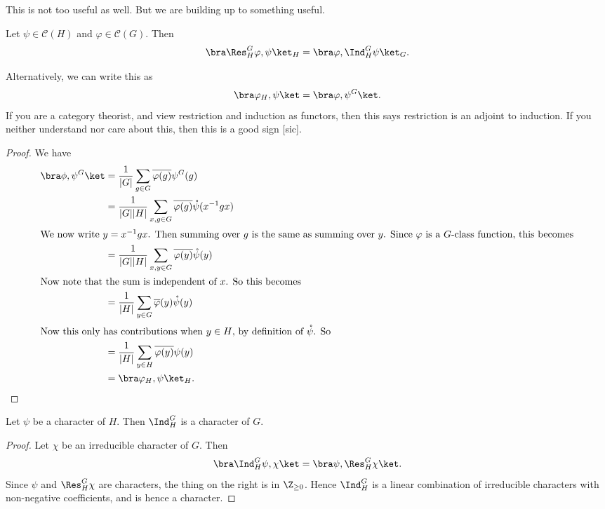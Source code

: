 \documentclass[a4paper]{article}
\begin{document}
This is not too useful as well. But we are building up to something useful.

\begin{thm}
  Let $\psi \in \mathcal{C}(H)$ and $\varphi \in \mathcal{C}(G)$. Then
  \[
    \bra \Res_H^G \varphi, \psi\ket_H = \bra \varphi, \Ind_H^G \psi\ket_G.
  \]
\end{thm}
Alternatively, we can write this as
\[
  \bra \varphi_H, \psi\ket = \bra \varphi, \psi^G\ket.
\]
If you are a category theorist, and view restriction and induction as functors, then this says restriction is an adjoint to induction. If you neither understand nor care about this, then this is a good sign [sic].

\begin{proof}
  We have
  \begin{align*}
    \bra \phi, \psi^G\ket &= \frac{1}{|G|} \sum_{g \in G} \overline{\varphi(g)}\psi^G(g) \\
    &= \frac{1}{|G||H|} \sum_{x, g \in G} \overline{\varphi(g)} \mathring{\psi}(x^{-1}gx)\\
    \intertext{We now write $y = x^{-1} gx$. Then summing over $g$ is the same as summing over $y$. Since $\varphi$ is a $G$-class function, this becomes}
    &= \frac{1}{|G||H|} \sum_{x, y \in G} \overline{\varphi(y)} \mathring{\psi}(y)\\
    \intertext{Now note that the sum is independent of $x$. So this becomes}
    &=\frac{1}{|H|} \sum_{y \in G} \overline{\varphi}(y) \mathring{\psi}(y)\\
    \intertext{Now this only has contributions when $y \in H$, by definition of $\mathring{\psi}$. So}
    &= \frac{1}{|H|} \sum_{y \in H} \overline{\varphi(y)}\psi(y)\\
    &= \bra \varphi_H, \psi\ket_H.
  \end{align*}
\end{proof}

\begin{cor}
  Let $\psi$ be a character of $H$. Then $\Ind_H^G$ is a character of $G$.
\end{cor}

\begin{proof}
  Let $\chi$ be an irreducible character of $G$. Then
  \[
    \bra \Ind_H^G \psi, \chi\ket = \bra \psi, \Res_H^G \chi\ket.
  \]
  Since $\psi$ and $\Res_H^G \chi$ are characters, the thing on the right is in $\Z_{\geq 0}$. Hence $\Ind_H^G$ is a linear combination of irreducible characters with non-negative coefficients, and is hence a character.
\end{proof}
\end{document}
